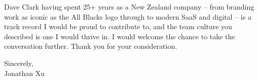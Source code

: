 \documentclass[11pt,a4paper]{article}
\begin{document}
Dave Clark having spent 25+ years as a New Zealand company -- from branding work as iconic as the All Blacks logo through to modern SaaS and digital -- is a track record I would be proud to contribute to, and the team culture you described is one I would thrive in. I would welcome the chance to take the conversation further. Thank you for your consideration.

\vspace{0.5em}

Sincerely, \\
Jonathan Xu
\end{document}
